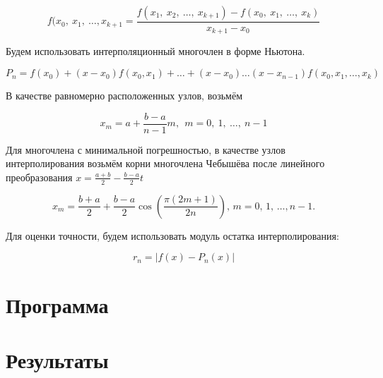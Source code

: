 \documentclass[12pt, a4paper]{article}
\begin{document}
\begin{equation}
	f(x_0, \ x_1, \ \dots  , x_{k+1} = \frac{f(x_1, \ x_2, \ \dots, \ x_{k+1})-f(x_0, \ x_1, \ \dots, \ x_k)}{x_{k+1}- x_0}
	\label{eqn:razn}
\end{equation}

Будем использовать интерполяционный многочлен в форме Ньютона.

\begin{equation}
    P_n = f(x_0) + (x-x_0) f(x_0, x_1) + \dots + (x-x_0) \dots (x-x_{n-1}) f(x_0,  x_1, \dots, x_k)
    \label{eqn:newton_p}
\end{equation}

В качестве равномерно расположенных узлов, возьмём

\begin{equation}
	x_m = a + \frac{b-a}{n-1}m, \ \ m = 0, \ 1, \ \dots, \ n-1
\end{equation}

Для многочлена с минимальной погрешностью, в качестве узлов интерполирования возьмём корни многочлена Чебышёва после линейного преобразования $x = \frac{a+b}{2} - \frac{b-a}{2}t$

\begin{equation}
    x_m = \frac{b+a}{2} + \frac{b-a}{2} \cos \left( \frac{\pi (2m + 1)}{2n}\right), \, m = 0, \, 1, \, \dots, n-1.
    \label{eqn:cheb}
\end{equation}

Для оценки точности, будем использовать модуль остатка интерполирования:

\begin{equation}
	 r_n  = |f(x) - P_n(x)|
\end{equation}
	
\section{Программа}
	

\newpage
\section{Результаты}
\end{document}
